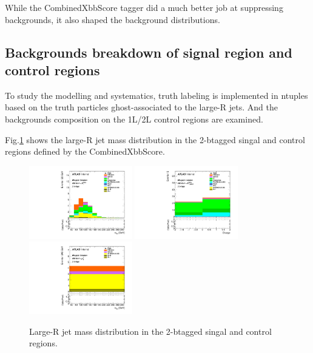\par While the CombinedXbbScore tagger did a much better job at suppressing backgrounds, it also shaped the background distributions. 

\subsection{Backgrounds breakdown of signal region and control regions}

\par To study the modelling and systematics, truth labeling is implemented in ntuples based on the truth particles ghost-associated to the large-R jets.
And the backgrounds composition on the 1L/2L control regions are examined.

\par Fig.\ref{fig:fl_mj} shows the large-R jet mass distribution in the 2-btagged singal and control regions defined by the CombinedXbbScore.

\begin{figure}[h]
    \centering
    \includegraphics[width=0.4\textwidth]{appendices/figures/Region_BMin500_incFat1_Fat1_incJet1_Y2015_DSR_T2_L0_distmBB_J0_Prefit.pdf}
    \includegraphics[width=0.4\textwidth]{appendices/figures/Region_BMin500_incFat1_Fat1_incJet1_Y2015_DCR1_T2_L1_distCharge_J0_Prefit.pdf}
    \includegraphics[width=0.4\textwidth]{appendices/figures/Region_BMin500_incFat1_Fat1_incJet1_Y2015_DCR2_T2_L2_distmBB_J0_Prefit.pdf}
    \caption{Large-R jet mass distribution in the 2-btagged singal and control regions.}
    \label{fig:fl_mj}
\end{figure}

